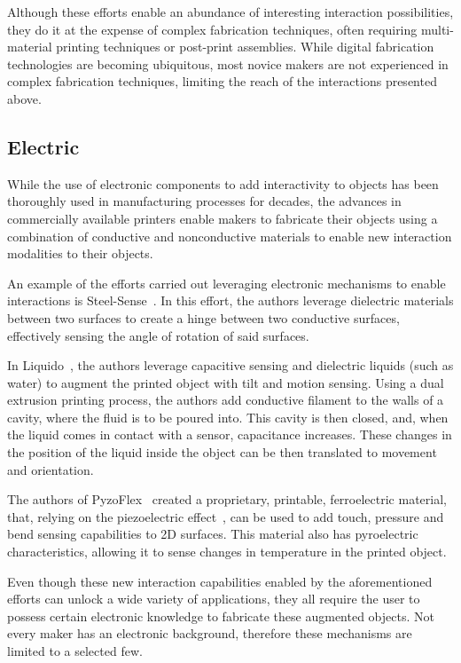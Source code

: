       Although these efforts enable an abundance of interesting interaction
      possibilities, they do it at the expense of complex fabrication
      techniques, often requiring multi-material printing techniques or
      post-print assemblies. While digital fabrication technologies are
      becoming ubiquitous, most novice makers are not experienced in complex
      fabrication techniques, limiting the reach of the interactions presented
      above.

    \subsection{Electric}
      While the use of electronic components to add interactivity to objects
      has been thoroughly used in manufacturing processes for decades, the
      advances in commercially available printers enable makers to fabricate
      their objects using a combination of conductive and nonconductive
      materials to enable new interaction modalities to their objects.

      An example of the efforts carried out leveraging electronic mechanisms to
      enable interactions is Steel-Sense~\cite{Vasilevitsky:2016hy}. In this
      effort, the authors leverage dielectric materials between two surfaces to
      create a hinge between two conductive surfaces, effectively sensing the
      angle of rotation of said surfaces.

      In Liquido~\cite{Schmitz:2016cv}, the authors leverage capacitive
      sensing and dielectric liquids (such as water) to augment the printed
      object with tilt and motion sensing. Using a dual extrusion printing
      process, the authors add conductive filament to the walls of a cavity,
      where the fluid is to be poured into. This cavity is then closed, and,
      when the liquid comes in contact with a sensor, capacitance increases.
      These changes in the position of the liquid inside the object can be then
      translated to movement and orientation.

      The authors of PyzoFlex~\cite{Rendl:2012er} created a
      proprietary, printable, ferroelectric material, that, relying on the
      piezoelectric effect~\cite{Cady:1964fh}, can be used to add touch, pressure and
      bend sensing capabilities to 2D surfaces. This material also has
      pyroelectric characteristics, allowing it to sense changes in temperature
      in the printed object.

      Even though these new interaction capabilities enabled by the
      aforementioned efforts can unlock a wide variety of applications, they
      all require the user to possess certain electronic knowledge to fabricate
      these augmented objects. Not every maker has an electronic background,
      therefore these mechanisms are limited to a selected few.

